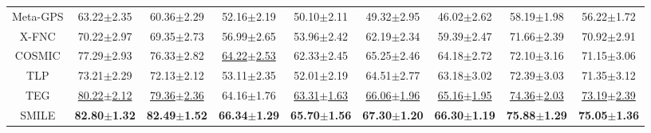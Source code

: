 \begin{table*}[ht]
{\begin{tabular}{@{}c|cccccccc@{}}
Meta-GPS               & 63.22$\pm$2.35             & 60.36$\pm$2.29            & 52.16$\pm$2.19          & 50.10$\pm$2.11          & 49.32$\pm$2.95              & 46.02$\pm$2.62             & 58.19$\pm$1.98          & 56.22$\pm$1.72          \\
X-FNC                  & 70.22$\pm$2.97       & 69.35$\pm$2.73            & 56.99$\pm$2.65          & 53.96$\pm$2.42          & 62.19$\pm$2.34              & 59.39$\pm$2.47             & 71.66$\pm$2.39          & 70.92$\pm$2.91          \\ 
COSMIC                   & 77.29$\pm$2.93             & 76.33$\pm$2.82      & \underline{64.22$\pm$2.53}    & 62.33$\pm$2.45    & 65.25$\pm$2.46        & 64.18$\pm$2.72 & 72.10$\pm$3.16    & 71.15$\pm$3.06    \\ 
TLP                   & 73.21$\pm$2.29             & 72.13$\pm$2.12      & 53.11$\pm$2.35    & 52.01$\pm$2.19    & 64.51$\pm$2.77        & 63.18$\pm$3.02       & 72.39$\pm$3.03    & 71.35$\pm$3.12    \\
TEG                   & \underline{80.22$\pm$2.12}             & \underline{79.36$\pm$2.36}      & 64.16$\pm$1.76    & \underline{63.31$\pm$1.63}    & \underline{66.06$\pm$1.96}        & \underline{65.16$\pm$1.95}       & \underline{74.36$\pm$2.03}    & \underline{73.19$\pm$2.39}    \\ \midrule
SMILE                  & \textbf{82.80$\pm$1.32}    & \textbf{82.49$\pm$1.52}   & \textbf{66.34$\pm$1.29} & \textbf{65.70$\pm$1.56} & \textbf{67.30$\pm$1.20}     & \textbf{66.30$\pm$1.19}    & \textbf{75.88$\pm$1.29} & \textbf{75.05$\pm$1.36} \\ \bottomrule
\end{tabular}%
}
\end{table*}

